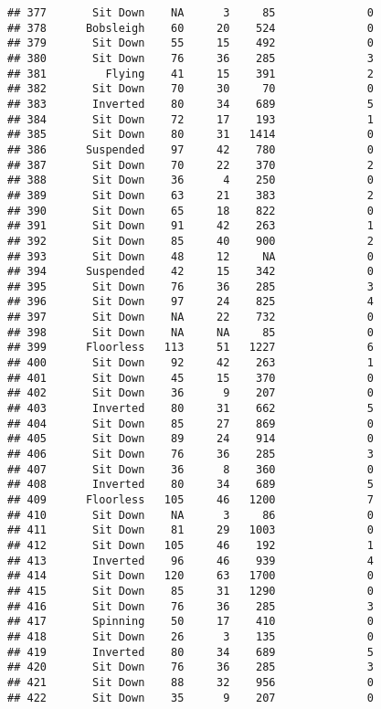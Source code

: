 \documentclass[
]{article}
\begin{document}
\begin{verbatim}
## 377       Sit Down    NA      3     85              0
## 378      Bobsleigh    60     20    524              0
## 379       Sit Down    55     15    492              0
## 380       Sit Down    76     36    285              3
## 381         Flying    41     15    391              2
## 382       Sit Down    70     30     70              0
## 383       Inverted    80     34    689              5
## 384       Sit Down    72     17    193              1
## 385       Sit Down    80     31   1414              0
## 386      Suspended    97     42    780              0
## 387       Sit Down    70     22    370              2
## 388       Sit Down    36      4    250              0
## 389       Sit Down    63     21    383              2
## 390       Sit Down    65     18    822              0
## 391       Sit Down    91     42    263              1
## 392       Sit Down    85     40    900              2
## 393       Sit Down    48     12     NA              0
## 394      Suspended    42     15    342              0
## 395       Sit Down    76     36    285              3
## 396       Sit Down    97     24    825              4
## 397       Sit Down    NA     22    732              0
## 398       Sit Down    NA     NA     85              0
## 399      Floorless   113     51   1227              6
## 400       Sit Down    92     42    263              1
## 401       Sit Down    45     15    370              0
## 402       Sit Down    36      9    207              0
## 403       Inverted    80     31    662              5
## 404       Sit Down    85     27    869              0
## 405       Sit Down    89     24    914              0
## 406       Sit Down    76     36    285              3
## 407       Sit Down    36      8    360              0
## 408       Inverted    80     34    689              5
## 409      Floorless   105     46   1200              7
## 410       Sit Down    NA      3     86              0
## 411       Sit Down    81     29   1003              0
## 412       Sit Down   105     46    192              1
## 413       Inverted    96     46    939              4
## 414       Sit Down   120     63   1700              0
## 415       Sit Down    85     31   1290              0
## 416       Sit Down    76     36    285              3
## 417       Spinning    50     17    410              0
## 418       Sit Down    26      3    135              0
## 419       Inverted    80     34    689              5
## 420       Sit Down    76     36    285              3
## 421       Sit Down    88     32    956              0
## 422       Sit Down    35      9    207              0

\end{verbatim}
\end{document}
